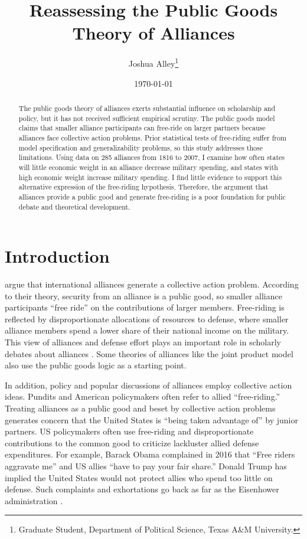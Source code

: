 \documentclass[12pt]{article}
\title{
\textbf{Reassessing the Public Goods Theory of Alliances}
	}
\author{Joshua Alley\footnote{Graduate Student,
Department of Political Science, Texas A\&M University.}}
\date{{\normalsize \today}}
\begin{document}
\maketitle 

\doublespace

\begin{abstract}
The public goods theory of alliances exerts substantial influence on scholarship and policy, but it has not received sufficient empirical scrutiny. 
The public goods model claims that smaller alliance participants can free-ride on larger partners because alliances face collective action problems. 
Prior statistical tests of free-riding suffer from model specification and generalizability problems, so this study addresses those limitations. 
Using data on 285 alliances from 1816 to 2007, I examine how often states will little economic weight in an alliance decrease military spending, and states with high economic weight increase military spending. 
I find little evidence to support this alternative expression of the free-riding hypothesis. 
Therefore, the argument that alliances provide a public good and generate free-riding is a poor foundation for public debate and theoretical development. 
\end{abstract} 

\newpage


\section{Introduction}



\citet{OlsonZeckhauser1966} argue that international alliances generate a collective action problem. 
According to their theory, security from an alliance is a public good, so smaller alliance participants ``free ride'' on the contributions of larger members. 
Free-riding is reflected by disproportionate allocations of resources to defense, where smaller alliance members spend a lower share of their national income on the military.
This view of alliances and defense effort plays an important role in scholarly debates about alliances \citep{Walt1990, Mearsheimer1994, Goldstein1995, SandlerHartley2001, Garfinkel2004, Walt2009, Norrlof2010, Barrett2010, PluemperNeumayer2015}. 
Some theories of alliances like the joint product model \citep{Sandler1993} also use the public goods logic as a starting point. 


In addition, policy and popular discussions of alliances employ collective action ideas.
Pundits and American policymakers often refer to allied ``free-riding.'' 
Treating alliances as a public good and beset by collective action problems generates concern that the United States is ``being taken advantage of'' by junior partners. 
US policymakers often use free-riding and disproportionate contributions to the common good to criticize lackluster allied defense expenditures.  
For example, Barack Obama complained in 2016 that ``Free riders aggravate me'' and US allies ``have to pay your fair share.'' 
Donald Trump has implied the United States would not protect allies who spend too little on defense. 
Such complaints and exhortations go back as far as the Eisenhower administration \citep{Lanoszka2015}.
\end{document}
